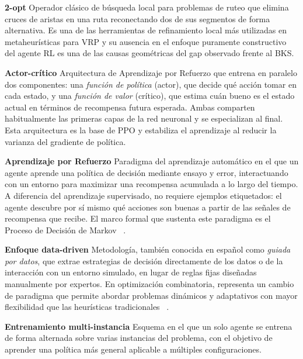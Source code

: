 {

{\setlength{\parskip}{0.35cm}
\setlength{\parindent}{0cm}

\hangindent=1.5cm \hypertarget{glo:2opt}{\textbf{2-opt}} Operador clásico de búsqueda local para problemas de ruteo que elimina cruces de aristas en una ruta reconectando dos de sus segmentos de forma alternativa. Es una de las herramientas de refinamiento local más utilizadas en metaheurísticas para VRP y su ausencia en el enfoque puramente constructivo del agente RL es una de las causas geométricas del gap observado frente al BKS.

\hangindent=1.5cm \hypertarget{glo:actorcritico}{\textbf{Actor-crítico}}
Arquitectura de Aprendizaje por Refuerzo que entrena en paralelo dos componentes: una \emph{función de política} (actor), que decide qué acción tomar en cada estado, y una \emph{función de valor} (crítico), que estima cuán bueno es el estado actual en términos de recompensa futura esperada. Ambas comparten habitualmente las primeras capas de la red neuronal y se especializan al final. Esta arquitectura es la base de PPO y estabiliza el aprendizaje al reducir la varianza del gradiente de política.

\hangindent=1.5cm \hypertarget{glo:aprendizaje}{\textbf{Aprendizaje por Refuerzo}}
Paradigma del aprendizaje automático en el que un agente aprende una política de decisión mediante ensayo y error, interactuando con un entorno para maximizar una recompensa acumulada a lo largo del tiempo. A diferencia del aprendizaje supervisado, no requiere ejemplos etiquetados: el agente descubre por sí mismo qué acciones son buenas a partir de las señales de recompensa que recibe. El marco formal que sustenta este paradigma es el Proceso de Decisión de Markov ~\cite{SuttonBarto2014}.

\hangindent=1.5cm \hypertarget{glo:datadriven}{\textbf{Enfoque data-driven}}
Metodología, también conocida en español como \emph{guiada por datos}, que extrae estrategias de decisión directamente de los datos o de la interacción con un entorno simulado, en lugar de reglas fijas diseñadas manualmente por expertos. En optimización combinatoria, representa un cambio de paradigma que permite abordar problemas dinámicos y adaptativos con mayor flexibilidad que las heurísticas tradicionales ~\cite{bertsimas2018predictiveprescriptiveanalytics}.

\hangindent=1.5cm \hypertarget{glo:multiinstancia}{\textbf{Entrenamiento multi-instancia}}
Esquema en el que un solo agente se entrena de forma alternada sobre varias instancias del problema, con el objetivo de aprender una política más general aplicable a múltiples configuraciones.

}}
